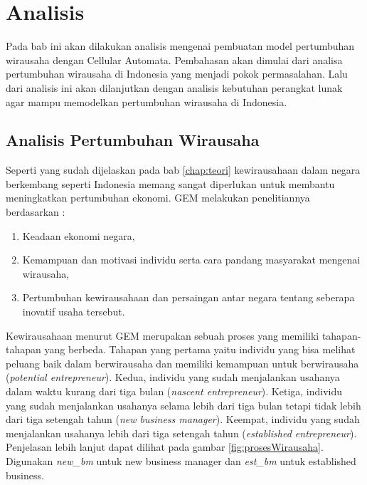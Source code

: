\chapter{Analisis}
\label{chap:analisis}


Pada bab ini akan dilakukan analisis mengenai pembuatan model pertumbuhan wirausaha dengan Cellular Automata. Pembahasan akan dimulai dari analisa pertumbuhan wirausaha di Indonesia yang menjadi pokok permasalahan. Lalu dari analisis ini akan dilanjutkan dengan analisis kebutuhan perangkat lunak agar mampu memodelkan pertumbuhan wirausaha di Indonesia.

\section{Analisis Pertumbuhan Wirausaha}
\label{sec:analisisPertumbuhanWirausaha}

Seperti yang sudah dijelaskan pada bab \ref{chap:teori} kewirausahaan dalam negara berkembang seperti Indonesia memang sangat diperlukan untuk membantu meningkatkan pertumbuhan ekonomi. GEM melakukan penelitiannya berdasarkan :
\begin{enumerate}
	\item Keadaan ekonomi negara,
	\item Kemampuan dan motivasi individu serta cara pandang masyarakat mengenai wirausaha,
	\item Pertumbuhan kewirausahaan dan persaingan antar negara tentang seberapa inovatif usaha tersebut.
\end{enumerate}  

Kewirausahaan menurut GEM merupakan sebuah proses yang memiliki tahapan-tahapan yang berbeda. Tahapan yang pertama yaitu individu yang bisa melihat peluang baik dalam berwirausaha dan memiliki kemampuan untuk berwirausaha (\textit{potential entrepreneur}). Kedua, individu yang sudah menjalankan usahanya dalam waktu kurang dari tiga bulan (\textit{nascent entrepreneur}). Ketiga, individu yang sudah menjalankan usahanya selama lebih dari tiga bulan tetapi tidak lebih dari tiga setengah tahun (\textit{new business manager}). Keempat, individu yang sudah menjalankan usahanya lebih dari tiga setengah tahun (\textit{established entrepreneur}). Penjelasan lebih lanjut dapat dilihat pada gambar \ref{fig:prosesWirausaha}. Digunakan \textit{new\_bm} untuk new business manager dan \textit{est\_bm} untuk established business. 

